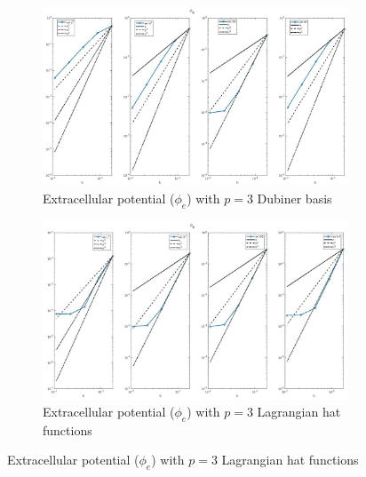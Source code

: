 \documentclass[a4paper,11pt]{article}
\begin{document}
\begin{figure}[H]
\caption{Comparison of the extracellular potential ($\phi_e$)}
\label{phie_3}
\begin{subfigure}{\textwidth}
\begin{center}
\includegraphics[width = \textwidth]{./D3_Phie_1.jpg}
\caption{Extracellular potential ($\phi_e$) with $p=3$ Dubiner basis}
\end{center}
\end{subfigure}
\begin{subfigure}{\textwidth}
\begin{center}
\includegraphics[width =\textwidth]{./P3_Phie_1.jpg}
\caption{Extracellular potential ($\phi_e$) with $p=3$ Lagrangian hat functions}
\end{center}
\end{subfigure}
\end{figure}
\newpage
\end{document}

